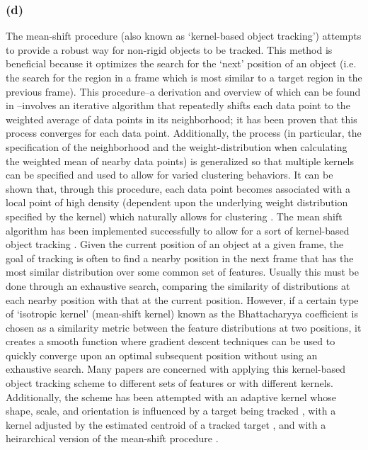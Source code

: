 \documentclass{article}
\begin{document}
\subsubsection*{(d)}
The mean-shift procedure (also known as `kernel-based object tracking') attempts to provide a robust way for non-rigid objects to be tracked. This method is beneficial because it optimizes the search for the `next' position of an object (i.e. the search for the region in a frame which is most similar to a target region in the previous frame). This procedure--a derivation and overview of which can be found in \citep{fukunaga_1975, cheng_1995}--involves an iterative algorithm that repeatedly shifts each data point to the weighted average of data points in its neighborhood; it has been proven that this process converges for each data point. Additionally, the process (in particular, the specification of the neighborhood and the weight-distribution when calculating the weighted mean of nearby data points) is generalized so that multiple kernels can be specified and used to allow for varied clustering behaviors. It can be shown that, through this procedure, each data point becomes associated with a local point of high density (dependent upon the underlying weight distribution specified by the kernel) which naturally allows for clustering \citep{cheng_1995}. The mean shift algorithm has been implemented successfully to allow for a sort of kernel-based object tracking \citep{comaniciu_2003, comaniciu_1999, comaniciu_2000}. Given the current position of an object at a given frame, the goal of tracking is often to find a nearby position in the next frame that has the most similar distribution over some common set of features. Usually this must be done through an exhaustive search, comparing the similarity of distributions at each nearby position with that at the current position. However, if a certain type of `isotropic kernel' (mean-shift kernel) known as the Bhattacharyya coefficient is chosen as a similarity metric between the feature distributions at two positions, it creates a smooth function where gradient descent techniques can be used to quickly converge upon an optimal subsequent position without using an exhaustive search. Many papers are concerned with applying this kernel-based object tracking scheme to different sets of features or with different kernels. Additionally, the scheme has been attempted with an adaptive kernel whose shape, scale, and orientation is influenced by a target being tracked \citep{wang_2004}, with a kernel adjusted by the estimated centroid of a tracked target \citep{mehmood_2009}, and with a heirarchical version of the mean-shift procedure \citep{dementhon_2002}. 
\end{document}
